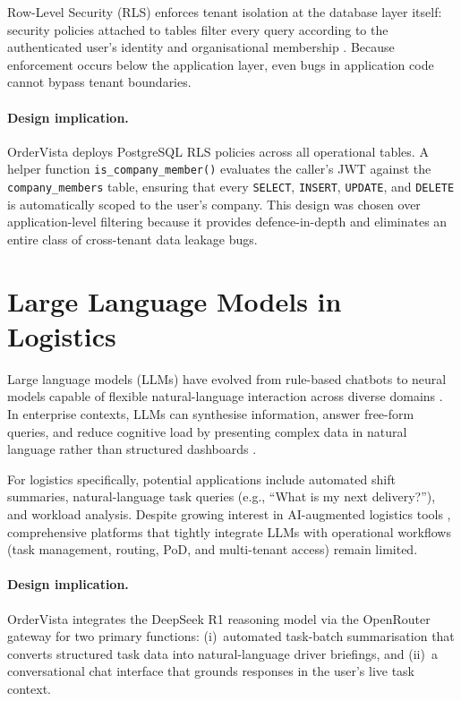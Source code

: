 Row-Level Security (RLS) enforces tenant isolation at the database layer itself: security policies attached to tables filter every query according to the authenticated user's identity and organisational membership \autocite{aws2020rls,postgresql2026rls}. Because enforcement occurs below the application layer, even bugs in application code cannot bypass tenant boundaries.

\paragraph{Design implication.}
OrderVista deploys PostgreSQL RLS policies across all operational tables. A helper function \texttt{is\_company\_member()} evaluates the caller's JWT against the \texttt{company\_members} table, ensuring that every \texttt{SELECT}, \texttt{INSERT}, \texttt{UPDATE}, and \texttt{DELETE} is automatically scoped to the user's company. This design was chosen over application-level filtering because it provides defence-in-depth and eliminates an entire class of cross-tenant data leakage bugs.

\section{Large Language Models in Logistics}
\label{sec:lit-llm}

Large language models (LLMs) have evolved from rule-based chatbots to neural models capable of flexible natural-language interaction across diverse domains \autocite{brown2020language}. In enterprise contexts, LLMs can synthesise information, answer free-form queries, and reduce cognitive load by presenting complex data in natural language rather than structured dashboards \autocite{brynjolfsson2023generative}.

For logistics specifically, potential applications include automated shift summaries, natural-language task queries (e.g., ``What is my next delivery?''), and workload analysis. Despite growing interest in AI-augmented logistics tools \autocite{addepto2024genai}, comprehensive platforms that tightly integrate LLMs with operational workflows (task management, routing, PoD, and multi-tenant access) remain limited.

\paragraph{Design implication.}
OrderVista integrates the DeepSeek R1 reasoning model \autocite{deepseek2025r1} via the OpenRouter gateway \autocite{openrouter2026docs} for two primary functions: (i)~automated task-batch summarisation that converts structured task data into natural-language driver briefings, and (ii)~a conversational chat interface that grounds responses in the user's live task context.

